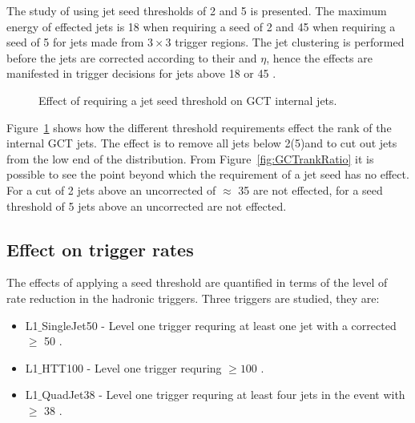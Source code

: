The study of using jet seed thresholds of 2 and 5 \GeV is presented. The 
maximum energy of effected jets is 18 \GeV when requiring a seed of 2 \GeV and 
45 \GeV when requiring a seed of 5 \GeV for jets made from $3\times3$ trigger 
regions. The jet clustering is performed before the \Lone jets are corrected 
according to their \ET and $\eta$, hence the effects are manifested in trigger 
decisions for \Lone jets above 18 or 45 \GeV.



\begin{figure}[h!]
    \centering
    \caption{Effect of requiring a jet seed threshold on GCT internal jets.}
    \label{fig:GCTrank}
\end{figure}


Figure~\ref{fig:GCTrank} shows how the different threshold requirements effect 
the rank of the internal GCT jets. The effect is to remove all jets below 
2(5)\GeV and to cut out jets from the low end of the distribution. From 
Figure~\ref{fig:GCTrankRatio} it is possible to see the point beyond which the 
requirement of a jet seed has no effect. For a cut of 2 \GeV jets above an 
uncorrected \ET of $\approx$ 35 \GeV are not effected, for a seed threshold of 
5 \GeV jets above an uncorrected  \GeV are not effected.


\subsection{Effect on trigger rates} %
\label{sec:Effects on Rate}
The effects of applying a seed threshold are quantified in terms of the level of rate
reduction in the \Lone hadronic triggers.
Three triggers are studied, they are:
\begin{itemize}
  \item L1$\_$SingleJet50 - Level one trigger requring at least one jet with a 
  corrected \ET $\geq$ 50 \GeV.
  \item L1$\_$HTT100 - Level one trigger requring \HT $\geq 100$ \GeV.
  \item L1$\_$QuadJet38 - Level one trigger requring at least four jets in the 
  event with \ET $\geq$ 38 \GeV.

\end{itemize}
